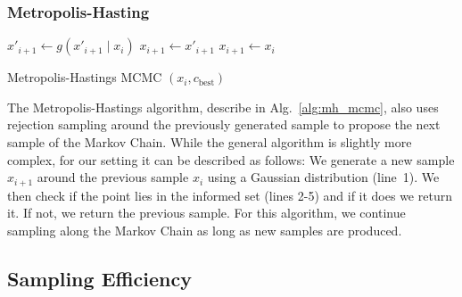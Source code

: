 \documentclass[letterpaper, 10 pt, conference]{ieeeconf}  %
\begin{document}
\subsubsection{Metropolis-Hasting}

\begin{algorithm}[t]
	\begin{algorithmic}[1]
		\STATE $ x'_{i+1} \leftarrow g( x'_{i+1} \mid x_{i} ) $
		  \RETURN $ x_{i+1} \leftarrow x'_{i+1} $ 
		\ELSE
		  \RETURN $ x_{i+1} \leftarrow x_{i} $
		\ENDIF 
	\end{algorithmic}
	\caption{Metropolis-Hastings MCMC $(x_{i}, c_{\text{best}})$}
	\label{alg:mh_mcmc}	
\end{algorithm}

The Metropolis-Hastings algorithm, describe in Alg.~\ref{alg:mh_mcmc}, also uses rejection sampling around the previously generated sample to propose the next sample of the Markov Chain.
While the general algorithm is slightly more complex, for our setting it can be described as follows:
We generate a new sample $ x_{i+1}$ around the previous sample $ x_{i}$ using a Gaussian distribution (line~1).
We then check if the point lies in the informed set (lines 2-5) and if it does we return it.
If not, we return the previous sample.
%
For this algorithm, we continue sampling along the Markov Chain as long as new samples are produced.



\label{sec:eval}


\subsection{Sampling Efficiency}
\end{document}
